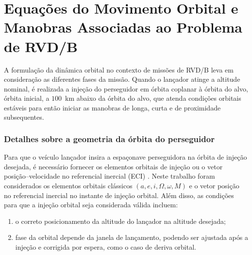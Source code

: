 \section{Equações do Movimento Orbital e Manobras Associadas ao Problema de RVD/B}
\label{sec:eq_mov_orbital_manobras}

A formulação da dinâmica orbital no contexto de missões de RVD/B leva em consideração as diferentes fases da missão.
Quando o lançador atinge a altitude nominal, é realizada a injeção do perseguidor em órbita coplanar à órbita do alvo, órbita inicial, a $100$~km abaixo da órbita do alvo, que atenda condições orbitais estáveis para então iniciar as manobras de longa, curta e de proximidade subsequentes.

\subsubsection{Detalhes sobre a geometria da órbita do perseguidor}

Para que o veículo lançador insira a espaçonave perseguidora na órbita de injeção desejada, é necessário fornecer os elementos orbitais \cite{vallado2007fundamentals} de injeção ou o vetor posição--velocidade no referencial inercial (ECI) .
Neste trabalho foram considerados os elementos orbitais clássicos $(a, e, i, \Omega, \omega, M)$ e o vetor posição no referencial inercial no instante de injeção orbital.
Além disso, as condições para que a injeção orbital seja considerada válida incluem:

\begin{enumerate}[label=(\roman*)]
    \item o correto posicionamento da altitude do lançador na altitude desejada;
    \item fase da orbital depende da janela de lançamento, podendo ser ajustada após a injeção e corrigida por espera, como o caso de deriva orbital.
\end{enumerate}

